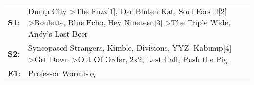 \begin{supertabular}{p{0.03\textwidth}p{0.92\textwidth}}
 \textbf{S1}:  &  Dump City\textsuperscript{} \textgreater \enspace The Fuzz[1]\textsuperscript{}, \enspace Der Bluten Kat\textsuperscript{}, \enspace Soul Food I[2]\textsuperscript{} \textgreater \enspace Roulette\textsuperscript{}, \enspace Blue Echo\textsuperscript{}, \enspace Hey Nineteen[3]\textsuperscript{} \textgreater \enspace The Triple Wide\textsuperscript{}, \enspace Andy's Last Beer\textsuperscript{}  \enspace  \\
 \textbf{S2}:  &     Syncopated Strangers\textsuperscript{}, \enspace Kimble\textsuperscript{}, \enspace Divisions\textsuperscript{}, \enspace YYZ\textsuperscript{}, \enspace Kabump[4]\textsuperscript{} \textgreater \enspace Get Down\textsuperscript{} \textgreater \enspace Out Of Order\textsuperscript{}, \enspace 2x2\textsuperscript{}, \enspace Last Call\textsuperscript{}, \enspace Push the Pig\textsuperscript{}  \enspace  \\
 \textbf{E1}:  &                                                                                                                                                                                                                                                                                                                                                                            Professor Wormbog\textsuperscript{}  \enspace  \\
\end{supertabular}
